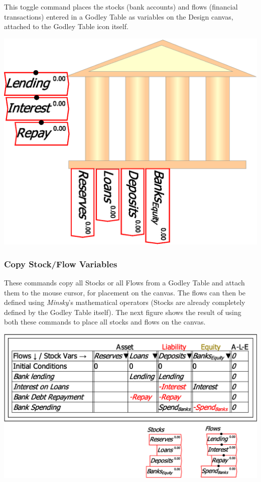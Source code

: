 This toggle command places the stocks (bank accounts) and flows (financial
transactions) entered in a Godley Table as variables on the Design
canvas, attached to the Godley Table icon itself.

\noindent\includegraphics[width=\textwidth]{images/GodleyTableIconModeShowVariables}

\subsubsection{Copy Stock/Flow Variables}

These commands copy all Stocks or all Flows from a Godley Table and
attach them to the mouse cursor, for placement on the canvas. The
flows can then be defined using \emph{Minsky}'s mathematical operators
(Stocks are already completely defined by the Godley Table itself).
The next figure shows the result of using both these commands to place
all stocks and flows on the canvas.

\noindent\includegraphics[width=\textwidth]{images/GodleyTableImagesStocksFlowsOnCanvas}

